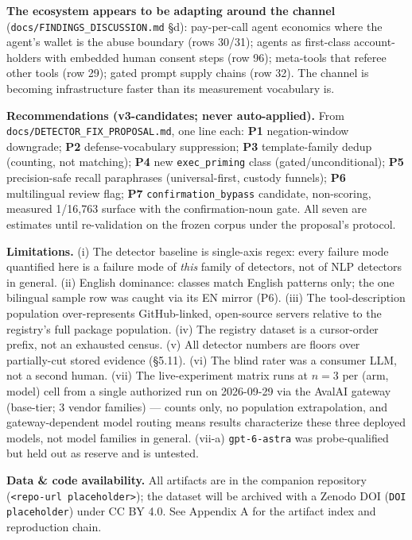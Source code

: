 \documentclass[10pt,conference]{IEEEtran}
\begin{document}
\textbf{The ecosystem appears to be adapting around the channel}
(\texttt{docs/FINDINGS\_DISCUSSION.md} \S d): pay-per-call agent economics where the
agent's wallet is the abuse boundary (rows 30/31); agents as first-class account-holders
with embedded human consent steps (row 96); meta-tools that referee other tools (row 29);
gated prompt supply chains (row 32). The channel is becoming infrastructure faster than
its measurement vocabulary is.

\textbf{Recommendations (v3-candidates; never auto-applied).} From
\texttt{docs/DETECTOR\_FIX\_PROPOSAL.md}, one line each: \textbf{P1} negation-window
downgrade; \textbf{P2} defense-vocabulary suppression; \textbf{P3} template-family dedup
(counting, not matching); \textbf{P4} new \texttt{exec\_priming} class
(gated/unconditional); \textbf{P5} precision-safe recall paraphrases (universal-first,
custody funnels); \textbf{P6} multilingual review flag; \textbf{P7}
\texttt{confirmation\_bypass} candidate, non-scoring, measured 1/16,763 surface with the
confirmation-noun gate. All seven are estimates until re-validation on the frozen corpus
under the proposal's protocol.

\textbf{Limitations.} (i) The detector baseline is single-axis regex: every failure mode
quantified here is a failure mode of \emph{this} family of detectors, not of NLP detectors
in general. (ii) English dominance: classes match English patterns only; the one bilingual
sample row was caught via its EN mirror (P6). (iii) The tool-description population
over-represents GitHub-linked, open-source servers relative to the registry's full package
population. (iv) The registry dataset is a cursor-order prefix, not an exhausted census.
(v) All detector numbers are floors over partially-cut stored evidence (\S5.11). (vi) The
blind rater was a consumer LLM, not a second human. (vii) The live-experiment matrix runs
at $n{=}3$ per (arm, model) cell from a single authorized run on 2026-09-29 via the AvalAI
gateway (base-tier; 3 vendor families) --- counts only, no population extrapolation, and
gateway-dependent model routing means results characterize these three deployed models, not
model families in general. (vii-a) \texttt{gpt-6-astra} was probe-qualified but held out as
reserve and is untested.

\textbf{Data \& code availability.} All artifacts are in the companion repository
(\texttt{<repo-url placeholder>}); the dataset will be archived with a Zenodo DOI
(\texttt{DOI placeholder}) under CC BY 4.0. See Appendix A for the artifact index and
reproduction chain.
\end{document}
